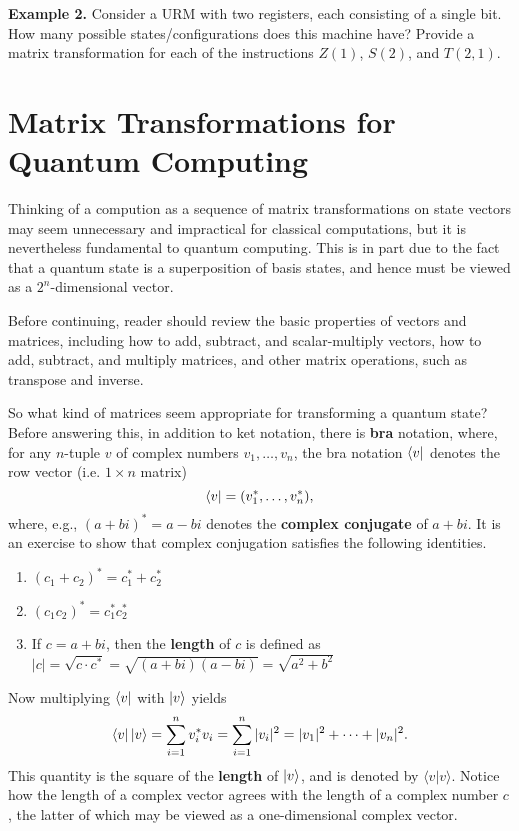 \documentclass [12pt]{article}
\theoremstyle{definition}
\begin{document}
\textbf{Example 2.} Consider a URM with two registers, each consisting of a single bit. How many possible states/configurations does this machine have?
Provide a matrix transformation for each of the instructions $Z(1)$, $S(2)$, and $T(2,1)$.


\newpage
\section*{Matrix Transformations for Quantum Computing}
Thinking of a compution as a sequence of matrix transformations on state vectors may seem unnecessary and impractical for classical computations, but it is nevertheless
fundamental to quantum computing.  This is in part due to the fact that a quantum state is a superposition of basis states, and hence must be viewed as a $2^n$-dimensional vector.

Before continuing, reader should review the basic properties of vectors and matrices, including how to add, subtract, and scalar-multiply vectors, how to add, subtract, and
multiply matrices, and other matrix operations, such as transpose and inverse. 

So what kind of matrices seem appropriate for transforming a quantum state? Before answering this, in addition to ket notation, there is \textbf{bra} notation,
where, for any $n$-tuple $v$ of complex numbers $v_1,\ldots,v_n$, the bra notation $\bra{v}$ denotes the row vector (i.e. $1\times n$ matrix)
\[\bra{v} = (v^*_1,\ldots,v^*_n),\]
where, e.g.,  $(a+bi)^*=a-bi$ denotes the \textbf{complex conjugate} of $a+bi$. It is an exercise to show that complex conjugation satisfies the following identities.

\begin{enumerate}
\item $(c_1+c_2)^* = c_1^* + c_2^*$
\item $(c_1c_2)^* = c_1^*c_2^*$
\item If $c=a+bi$, then the \textbf{length} of $c$ is defined as $|c| = \sqrt{c\cdot c^*} = \sqrt{(a+bi)(a-bi)} = \sqrt{a^2 + b^2}$
\end{enumerate}

Now multiplying $\bra{v}$ with $\ket{v}$ yields
\[\bra{v}\ket{v} = \sum_{i=1}^{n}v^*_iv_i = \sum_{i=1}^{n}|v_i|^2 = |v_1|^2+\cdots +|v_n|^2.\]
This quantity is the square of the \textbf{length} of $\ket{v}$, and is denoted by $\langle v|v\rangle$. Notice how the length of a complex vector agrees with the length 
of a complex number $c$, the latter of which may be viewed as a one-dimensional complex vector. 
\end{document}

